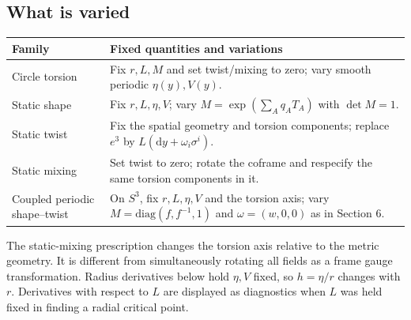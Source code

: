 \subsection{What is varied}

\begin{longtable}{@{}>{\raggedright\arraybackslash}p{}>{\raggedright\arraybackslash}p{}@{}}
\toprule
\textbf{Family} & \textbf{Fixed quantities and variations} \\ \midrule
\endhead

Circle torsion & Fix $r,L,M$ and set twist/mixing to zero; vary smooth periodic $\eta(y),V(y)$. \\[4pt]

Static shape & Fix $r,L,\eta,V$; vary $M=\exp(\sum_A q_A T_A)$ with $\det M=1$. \\[4pt]

Static twist & Fix the spatial geometry and torsion components; replace $e^3$ by $L(\mathrm{d}y+\omega_i\sigma^i)$. \\[4pt]

Static mixing & Set twist to zero; rotate the coframe and respecify the same torsion components in it. \\[4pt]

Coupled periodic shape--twist & On $S^3$, fix $r,L,\eta,V$ and the torsion axis; vary $M=\mathrm{diag}(f,f^{-1},1)$ and $\omega=(w,0,0)$ as in Section 6. \\[4pt]

\bottomrule\end{longtable}

The static-mixing prescription changes the torsion axis relative to the metric geometry. It is different from simultaneously rotating all fields as a frame gauge transformation. Radius derivatives below hold $\eta,V$ fixed, so $h=\eta/r$ changes with $r$. Derivatives with respect to $L$ are displayed as diagnostics when $L$ was held fixed in finding a radial critical point.
